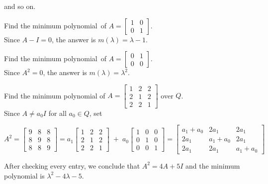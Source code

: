 \documentclass[a4paper]{article}
\theoremstyle{plain} %
{\theorembodyfont{\normalfont}
\newtheorem{Exa}{Example}}
\def\mp{minimum polynomial}
\begin{document}
and so on.

\begin{Exa}
Find the \mp\ of $A = \left[ \begin{array}{cc} 1 & 0
\\ 0 & 1 \end{array} \right]$. \\%
\vspace{0.5\baselineskip} %
Since $A-I=0$, the answer is $m(\lambda)=\lambda -1$.
\end{Exa}

\begin{Exa}
Find the \mp\ of $A = \left[ \begin{array}{cc} 0 & 1
\\ 0 & 0 \end{array} \right]$. \\%
\vspace{0.5\baselineskip} %
Since $A^2=0$, the answer is $m(\lambda)={\lambda}^2$.
\end{Exa}

\begin{Exa}\label{ex3}
Find the minimum polynomial of $A = \left[
\begin{array}{ccc} 1 & 2 & 2\\
2 & 1 & 2 \\ 2 & 2 & 1 \end{array} \right]$ over $Q$. \\ %

Since $A \neq a_0I$ for all $a_0 \in Q$, set%

\vspace{0.5\baselineskip} %

     $A^2 = \left[ \begin{array}{ccc}
            9 & 8 & 8 \\
            8 & 9 & 8 \\
            8 & 8 & 9
       \end{array} \right]
        = a_1 \! \left[ \begin{array}{ccc}
            1 & 2 & 2 \\
            2 & 1 & 2 \\
            2 & 2 & 1
       \end{array} \right]
       \; + \; a_0 \! \left[\begin{array}{ccc}
            1 & 0 & 0 \\
            0 & 1 & 0 \\
            0 & 0 & 1
       \end{array}\right]
       = \left[ \begin{array}{ccc}
            a_1\!+\!a_0 & 2a_1 & 2a_1 \\
            2a_1 & a_1\!+\!a_0 & 2a_1\\
            2a_1 & 2a_1 & a_1\!+\!a_0
       \end{array} \right]$

\vspace{0.5\baselineskip}

After checking every entry, we conclude that $A^2 = 4A + 5I$ and
the minimum polynomial is ${\lambda}^2 -4\lambda - 5$.

\end{Exa}
\end{document}
